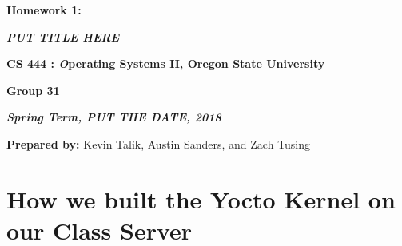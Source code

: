 \documentclass[onecolumn, draftclsnofoot,10pt, compsoc]{IEEEtran}
\def \GroupMemberOne{			Kevin Talik}
\def \GroupMemberTwo{			Austin Sanders}
\def \GroupMemberThree{			Zach Tusing}
\begin{document}
 	\begin{center}
	\huge\bf{ Homework 1:} 
   
    \large\textbf{\textit{ PUT TITLE HERE }}\par
     
    
    
	\small{\bf CS 444 : \textit Operating Systems II, Oregon State University}\par
    \small{\bf{Group 31}}
    
    
    {\bf\textit{ Spring Term, PUT THE DATE, 2018} }
    
    
    {\small {\bf Prepared by:} \GroupMemberOne, \GroupMemberTwo, and \GroupMemberThree }
        \end{center}
 		\vfill

       \pagebreak
       \section{How we built the Yocto Kernel on our Class Server}
        
\end{document}
